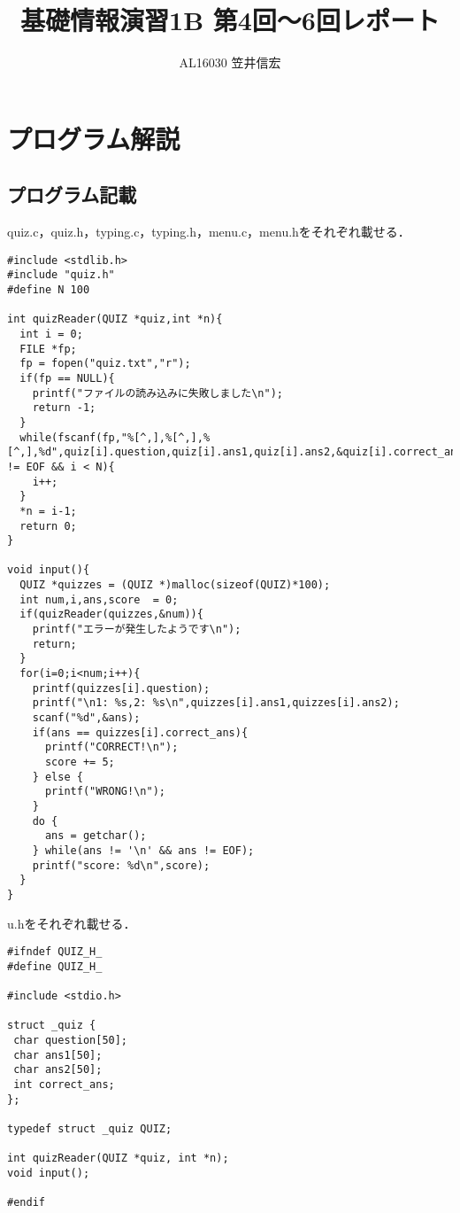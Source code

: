 \documentclass[a4j,12pt]{jreport}
\title{基礎情報演習1B
第4回～6回レポート}
\author{AL16030 笠井信宏}
\begin{document}
\maketitle
\chapter{プログラム解説}
\section{プログラム記載}
quiz.c，quiz.h，typing.c，typing.h，menu.c，menu.hをそれぞれ載せる．

\begin{lstlisting}[caption=quiz.c,label=quiz.c]
#include <stdlib.h>
#include "quiz.h"
#define N 100

int quizReader(QUIZ *quiz,int *n){
  int i = 0;
  FILE *fp;
  fp = fopen("quiz.txt","r");
  if(fp == NULL){
    printf("ファイルの読み込みに失敗しました\n");
    return -1;
  }
  while(fscanf(fp,"%[^,],%[^,],%[^,],%d",quiz[i].question,quiz[i].ans1,quiz[i].ans2,&quiz[i].correct_ans) != EOF && i < N){
    i++;
  }
  *n = i-1;
  return 0;
}

void input(){
  QUIZ *quizzes = (QUIZ *)malloc(sizeof(QUIZ)*100);
  int num,i,ans,score  = 0;
  if(quizReader(quizzes,&num)){
    printf("エラーが発生したようです\n");
    return;
  }
  for(i=0;i<num;i++){
    printf(quizzes[i].question);
    printf("\n1: %s,2: %s\n",quizzes[i].ans1,quizzes[i].ans2);
    scanf("%d",&ans);
    if(ans == quizzes[i].correct_ans){
      printf("CORRECT!\n");
      score += 5;
    } else {
      printf("WRONG!\n");
    }
    do {
      ans = getchar();
    } while(ans != '\n' && ans != EOF);
    printf("score: %d\n",score);
  }
}
\end{lstlisting}

u.hをそれぞれ載せる．

\begin{lstlisting}[caption=quiz.h,label=quiz.h]
#ifndef QUIZ_H_
#define QUIZ_H_

#include <stdio.h>

struct _quiz {
 char question[50];
 char ans1[50];
 char ans2[50];
 int correct_ans;
};

typedef struct _quiz QUIZ;

int quizReader(QUIZ *quiz, int *n);
void input();

#endif
\end{lstlisting}
\end{document}
